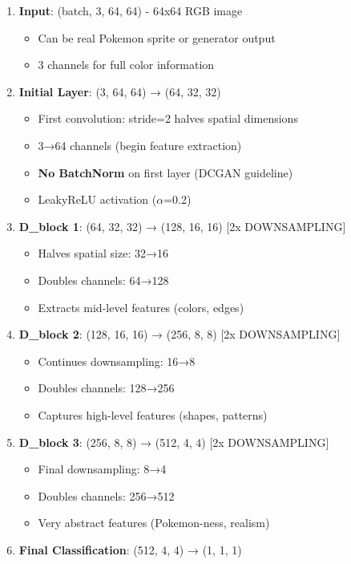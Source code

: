 \documentclass[11pt]{article}
\providecommand{\tightlist}{%
      \setlength{\itemsep}{0pt}\setlength{\parskip}{0pt}}
\begin{document}
\begin{enumerate}
\def\labelenumi{\arabic{enumi}.}
\tightlist
\item
  \textbf{Input}: (batch, 3, 64, 64) - 64x64 RGB image

  \begin{itemize}
  \tightlist
  \item
    Can be real Pokemon sprite or generator output
  \item
    3 channels for full color information
  \end{itemize}
\item
  \textbf{Initial Layer}: (3, 64, 64) → (64, 32, 32)

  \begin{itemize}
  \tightlist
  \item
    First convolution: stride=2 halves spatial dimensions
  \item
    3→64 channels (begin feature extraction)
  \item
    \textbf{No BatchNorm} on first layer (DCGAN guideline)
  \item
    LeakyReLU activation (\(\alpha\)=0.2)
  \end{itemize}
\item
  \textbf{D\_block 1}: (64, 32, 32) → (128, 16, 16) {[}2x
  DOWNSAMPLING{]}

  \begin{itemize}
  \tightlist
  \item
    Halves spatial size: 32→16
  \item
    Doubles channels: 64→128
  \item
    Extracts mid-level features (colors, edges)
  \end{itemize}
\item
  \textbf{D\_block 2}: (128, 16, 16) → (256, 8, 8) {[}2x DOWNSAMPLING{]}

  \begin{itemize}
  \tightlist
  \item
    Continues downsampling: 16→8
  \item
    Doubles channels: 128→256
  \item
    Captures high-level features (shapes, patterns)
  \end{itemize}
\item
  \textbf{D\_block 3}: (256, 8, 8) → (512, 4, 4) {[}2x DOWNSAMPLING{]}

  \begin{itemize}
  \tightlist
  \item
    Final downsampling: 8→4
  \item
    Doubles channels: 256→512
  \item
    Very abstract features (Pokemon-ness, realism)
  \end{itemize}
\item
  \textbf{Final Classification}: (512, 4, 4) → (1, 1, 1)


\end{enumerate}
\end{document}
